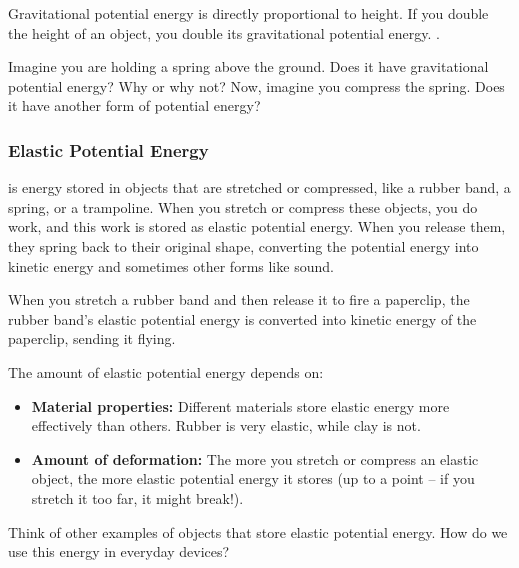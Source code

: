 \begin{marginnote}
Gravitational potential energy is directly proportional to height.  If you double the height of an object, you double its gravitational potential energy. .
\end{marginnote}

\begin{stopandthink}
Imagine you are holding a spring above the ground. Does it have gravitational potential energy? Why or why not? Now, imagine you compress the spring. Does it have another form of potential energy?
\end{stopandthink}


\subsubsection{Elastic Potential Energy}

 is energy stored in objects that are stretched or compressed, like a rubber band, a spring, or a trampoline. When you stretch or compress these objects, you do work, and this work is stored as elastic potential energy.  When you release them, they spring back to their original shape, converting the potential energy into kinetic energy and sometimes other forms like sound.

\begin{example}
When you stretch a rubber band and then release it to fire a paperclip, the rubber band’s elastic potential energy is converted into kinetic energy of the paperclip, sending it flying.
\end{example}

The amount of elastic potential energy depends on:

\begin{itemize}
    \item \textbf{Material properties:}  Different materials store elastic energy more effectively than others. Rubber is very elastic, while clay is not.
    \item \textbf{Amount of deformation:} The more you stretch or compress an elastic object, the more elastic potential energy it stores (up to a point – if you stretch it too far, it might break!).
\end{itemize}

\begin{stopandthink}
Think of other examples of objects that store elastic potential energy. How do we use this energy in everyday devices?
\end{stopandthink}


